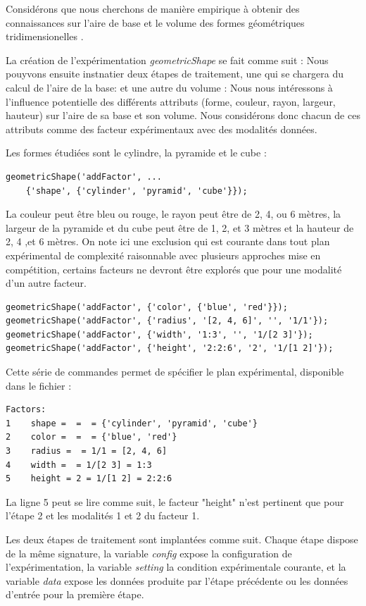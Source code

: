 Considérons que nous cherchons de manière empirique à obtenir des connaissances sur l'aire de base et le volume des formes géométriques tridimensionelles .

La création de l'expérimentation \textsl{geometricShape} se fait comme suit :
Nous pouyvons ensuite instnatier deux étapes de traitement, une qui se chargera du calcul de l'aire de la base:
et une autre du volume :
Nous nous intéressons à l'influence potentielle des différents attributs (forme, couleur, rayon, largeur, hauteur) sur l'aire de sa base et son volume. Nous considérons donc chacun de ces attributs comme des facteur expérimentaux avec des modalités données.

Les formes étudiées sont le cylindre, la pyramide et le cube :
\begin{lstlisting}
geometricShape('addFactor', ...
	{'shape', {'cylinder', 'pyramid', 'cube'}});
\end{lstlisting}
La couleur peut être bleu ou rouge, le rayon peut être de 2, 4, ou 6 mètres, la largeur de la pyramide et du cube peut être de 1, 2, et 3 mètres et la hauteur de 2, 4 ,et 6 mètres. On note ici une exclusion qui est courante dans tout plan expérimental de complexité raisonnable avec plusieurs approches mise en compétition, certains facteurs ne devront être explorés que pour une modalité d'un autre facteur.
\begin{lstlisting}
geometricShape('addFactor', {'color', {'blue', 'red'}});
geometricShape('addFactor', {'radius', '[2, 4, 6]', '', '1/1'});
geometricShape('addFactor', {'width', '1:3', '', '1/[2 3]'});
geometricShape('addFactor', {'height', '2:2:6', '2', '1/[1 2]'});
\end{lstlisting}
Cette série de commandes permet de spécifier le plan expérimental, disponible dans le fichier  :
\begin{lstlisting}
Factors:
1    shape =  =  = {'cylinder', 'pyramid', 'cube'}
2    color =  =  = {'blue', 'red'}
3    radius =  = 1/1 = [2, 4, 6]
4    width =  = 1/[2 3] = 1:3
5    height = 2 = 1/[1 2] = 2:2:6
\end{lstlisting}
La ligne 5 peut se lire comme suit, le facteur "height" n'est pertinent que pour l'étape 2 et les modalités 1 et 2 du facteur 1.

Les deux étapes de traitement sont implantées comme suit. Chaque étape dispose de la même signature, la variable \textsl{config} expose la configuration de l'expérimentation, la variable \textsl{setting} la condition expérimentale courante, et la variable \textsl{data} expose les données produite par l'étape précédente ou les données d'entrée pour la première étape.

